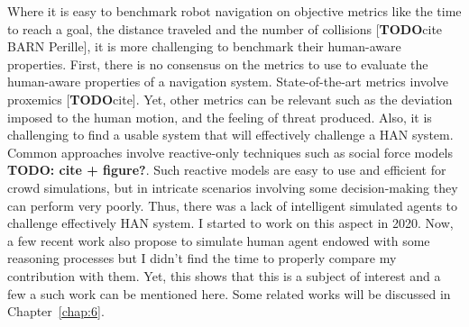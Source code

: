 Where it is easy to benchmark robot navigation on objective metrics like the time to reach a goal, the distance traveled and the number of collisions [\textbf{TODO}cite BARN Perille], it is more challenging to benchmark their human-aware properties.
First, there is no consensus on the metrics to use to evaluate the human-aware properties of a navigation system. State-of-the-art metrics involve proxemics [\textbf{TODO}cite]. Yet, other metrics can be relevant such as the deviation imposed to the human motion, and the feeling of threat produced.
Also, it is challenging to find a usable system that will effectively challenge a HAN system. 
Common approaches involve reactive-only techniques such as social force models \textbf{TODO: cite + figure?}. Such reactive models are easy to use and efficient for crowd simulations, but in intricate scenarios involving some decision-making they can perform very poorly. Thus, there was a lack of intelligent simulated agents to challenge effectively HAN system.
I started to work on this aspect in 2020. Now, a few recent work also propose to simulate human agent endowed with some reasoning processes but I didn't find the time to properly compare my contribution with them. Yet, this shows that this is a subject of interest and a few a such work can be mentioned here. Some related works will be discussed in Chapter~\ref{chap:6}.
